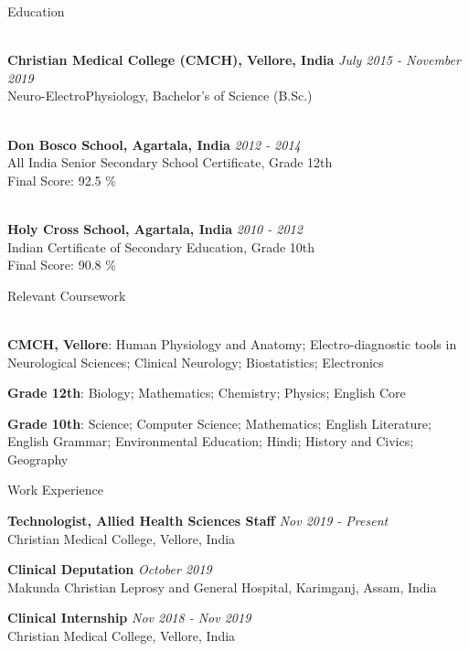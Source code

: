 \documentclass{resume} %
\begin{document}

\begin{rSection}{Education}

\\{\bf Christian Medical College (CMCH), Vellore, India} \hfill {\em July 2015 - November 2019}
\\ Neuro-ElectroPhysiology, Bachelor's of Science (B.Sc.)

\\{\bf Don Bosco School, Agartala, India} \hfill {\em 2012 - 2014} 
\\ All India Senior Secondary School Certificate, Grade 12th
\\ Final Score: 92.5 \%

\\{\bf Holy Cross School, Agartala, India} \hfill {\em 2010 - 2012}
\\ Indian Certificate of Secondary Education, Grade 10th
\\ Final Score: 90.8 \%

\begin{rSubsection}{\large Relevant Coursework}{}{}{} \\ 
\\ \item {\bf CMCH, Vellore}: Human Physiology and Anatomy; Electro-diagnostic tools in Neurological Sciences; Clinical Neurology; Biostatistics; Electronics \\
\item {\bf Grade 12th}: Biology; Mathematics; Chemistry; Physics; English Core \\
\item {\bf Grade 10th}: Science; Computer Science; Mathematics; English Literature; English Grammar; Environmental Education; Hindi; History and Civics; Geography \\
\end{rSubsection}
\end{rSection}

\begin{rSection}{Work Experience}
\item {\bf Technologist, Allied Health Sciences Staff} \hfill {\em Nov 2019 - Present} \\
Christian Medical College, Vellore, India
\item {\bf Clinical Deputation} \hfill {\em October 2019} \\
Makunda Christian Leprosy and General Hospital, Karimganj, Assam, India
\item {\bf Clinical Internship} \hfill {\em Nov 2018 - Nov 2019} \\
Christian Medical College, Vellore, India
\end{rSection}
\end{document}
